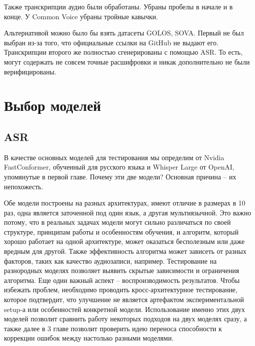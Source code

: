 Также транскрипции аудио были обработаны.
Убраны пробелы в начале и в конце.
У Common Voice убраны тройные кавычки.

Альтернативой можно было бы взять датасеты GOLOS\cite{karpov2021golos}, SOVA\cite{sova2021rudevices}.
Первый не был выбран из-за того, что официальные ссылки на GitHub не выдают его.
Транскрипции второго же полностью сгенерированы с помощью ASR.
То есть, могут содержать не совсем точные расшифровки и никак дополнительно не были верифицированы.

\section{Выбор моделей}
\subsection{ASR}

В качестве основных моделей для тестирования мы определим от Nvidia FastConformer, обученный для русского языка и Whisper Large от OpenAI, упомянутые в первой главе.
Почему эти две модели? Основная причина -- их непохожесть.

Обе модели построены на разных архитектурах, имеют отличие в размерах в 10 раз, одна является заточенной под один язык, а другая мультиязычной.
Это важно потому, что в реальных задачах модели могут сильно различаться по своей структуре, принципам работы и особенностям обучения, и алгоритм, который хорошо работает на одной архитектуре, может оказаться бесполезным или даже вредным для другой.
Также эффективность алгоритма может  зависеть от разных факторов, таких как качество аудиозаписи, например.
Тестирование на разнородных моделях позволяет выявить скрытые зависимости и ограничения алгоритма.
Еще один важный аспект -- воспроизводимость результатов.
Чтобы избежать проблем, необходимо проводить кросс-архитектурное тестирование, которое подтвердит, что улучшение не является артефактом экспериментальной setup-а или особенностей конкретной модели.
Использование именно этих двух моделей позволит сравнить работу некоторых подходов на двух моделях сразу, а также далее в 3 главе позволит проверить идею переноса способности к коррекции ошибок между настолько разными моделями.

